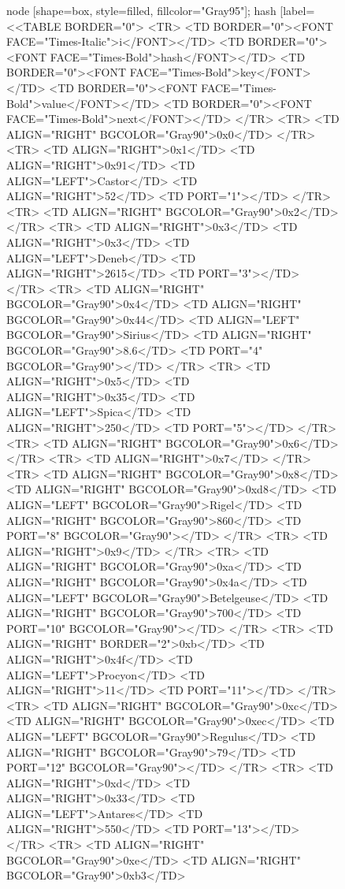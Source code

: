 \documentclass[12pt]{article}
\begin{document}
\begin{figure}
{{	node [shape=box, style=filled, fillcolor="Gray95"];
	hash [label=<<TABLE BORDER="0">
	<TR>
		<TD BORDER="0"><FONT FACE="Times-Italic">i</FONT></TD>
		<TD BORDER="0"><FONT FACE="Times-Bold">hash</FONT></TD>
		<TD BORDER="0"><FONT FACE="Times-Bold">key</FONT></TD>
		<TD BORDER="0"><FONT FACE="Times-Bold">value</FONT></TD>
		<TD BORDER="0"><FONT FACE="Times-Bold">next</FONT></TD>
	</TR>
	<TR>
		<TD ALIGN="RIGHT" BGCOLOR="Gray90">0x0</TD>
	</TR>
	<TR>
		<TD ALIGN="RIGHT">0x1</TD>
		<TD ALIGN="RIGHT">0x91</TD>
		<TD ALIGN="LEFT">Castor</TD>
		<TD ALIGN="RIGHT">52</TD>
		<TD PORT="1">
	</TR>
	<TR>
		<TD ALIGN="RIGHT" BGCOLOR="Gray90">0x2</TD>
	</TR>
	<TR>
		<TD ALIGN="RIGHT">0x3</TD>
		<TD ALIGN="RIGHT">0x3</TD>
		<TD ALIGN="LEFT">Deneb</TD>
		<TD ALIGN="RIGHT">2615</TD>
		<TD PORT="3">
	</TR>
	<TR>
		<TD ALIGN="RIGHT" BGCOLOR="Gray90">0x4</TD>
		<TD ALIGN="RIGHT" BGCOLOR="Gray90">0x44</TD>
		<TD ALIGN="LEFT" BGCOLOR="Gray90">Sirius</TD>
		<TD ALIGN="RIGHT" BGCOLOR="Gray90">8.6</TD>
		<TD PORT="4" BGCOLOR="Gray90">
	</TR>
	<TR>
		<TD ALIGN="RIGHT">0x5</TD>
		<TD ALIGN="RIGHT">0x35</TD>
		<TD ALIGN="LEFT">Spica</TD>
		<TD ALIGN="RIGHT">250</TD>
		<TD PORT="5">
	</TR>
	<TR>
		<TD ALIGN="RIGHT" BGCOLOR="Gray90">0x6</TD>
	</TR>
	<TR>
		<TD ALIGN="RIGHT">0x7</TD>
	</TR>
	<TR>
		<TD ALIGN="RIGHT" BGCOLOR="Gray90">0x8</TD>
		<TD ALIGN="RIGHT" BGCOLOR="Gray90">0xd8</TD>
		<TD ALIGN="LEFT" BGCOLOR="Gray90">Rigel</TD>
		<TD ALIGN="RIGHT" BGCOLOR="Gray90">860</TD>
		<TD PORT="8" BGCOLOR="Gray90">
	</TR>
	<TR>
		<TD ALIGN="RIGHT">0x9</TD>
	</TR>
	<TR>
		<TD ALIGN="RIGHT" BGCOLOR="Gray90">0xa</TD>
		<TD ALIGN="RIGHT" BGCOLOR="Gray90">0x4a</TD>
		<TD ALIGN="LEFT" BGCOLOR="Gray90">Betelgeuse</TD>
		<TD ALIGN="RIGHT" BGCOLOR="Gray90">700</TD>
		<TD PORT="10" BGCOLOR="Gray90">
	</TR>
	<TR>
		<TD ALIGN="RIGHT" BORDER="2">0xb</TD>
		<TD ALIGN="RIGHT">0x4f</TD>
		<TD ALIGN="LEFT">Procyon</TD>
		<TD ALIGN="RIGHT">11</TD>
		<TD PORT="11">
	</TR>
	<TR>
		<TD ALIGN="RIGHT" BGCOLOR="Gray90">0xc</TD>
		<TD ALIGN="RIGHT" BGCOLOR="Gray90">0xec</TD>
		<TD ALIGN="LEFT" BGCOLOR="Gray90">Regulus</TD>
		<TD ALIGN="RIGHT" BGCOLOR="Gray90">79</TD>
		<TD PORT="12" BGCOLOR="Gray90">
	</TR>
	<TR>
		<TD ALIGN="RIGHT">0xd</TD>
		<TD ALIGN="RIGHT">0x33</TD>
		<TD ALIGN="LEFT">Antares</TD>
		<TD ALIGN="RIGHT">550</TD>
		<TD PORT="13">
	</TR>
	<TR>
		<TD ALIGN="RIGHT" BGCOLOR="Gray90">0xe</TD>
		<TD ALIGN="RIGHT" BGCOLOR="Gray90">0xb3</TD>
}}
\end{figure}
\end{document}
